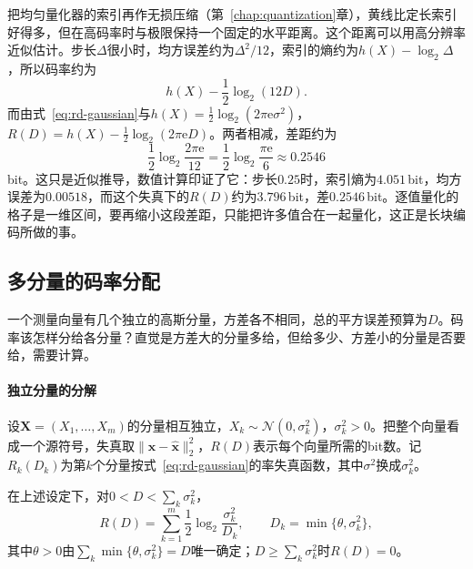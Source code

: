 把均匀量化器的索引再作无损压缩（第~\ref{chap:quantization}章），黄线比定长索引好得多，但在高码率时与极限保持一个固定的水平距离。这个距离可以用高分辨率近似估计。步长$\Delta$很小时，均方误差约为$\Delta^{2}/12$，索引的熵约为$h(X)-\log_2\Delta$，所以码率约为
\[
  h(X)-\frac12\log_2(12D).
\]
而由式~\eqref{eq:rd-gaussian}与$h(X)=\frac12\log_2(2\pi\mathrm{e}\sigma^{2})$，$R(D)=h(X)-\frac12\log_2(2\pi\mathrm{e}D)$。两者相减，差距约为
\[
  \frac12\log_2\frac{2\pi\mathrm{e}}{12}=\frac12\log_2\frac{\pi\mathrm{e}}{6}\approx0.2546
\]
bit。这只是近似推导，数值计算印证了它：步长$0.25$时，索引熵为$4.051$\,bit，均方误差为$0.00518$，而这个失真下的$R(D)$约为$3.796$\,bit，差$0.2546$\,bit。逐值量化的格子是一维区间，要再缩小这段差距，只能把许多值合在一起量化，这正是长块编码所做的事。

\subsection{多分量的码率分配}
\label{sec:rd-allocation}

一个测量向量有几个独立的高斯分量，方差各不相同，总的平方误差预算为$D$。码率该怎样分给各分量？直觉是方差大的分量多给，但给多少、方差小的分量是否要给，需要计算。

\paragraph{独立分量的分解}
设$\bm{X}=(X_1,\dots,X_m)$的分量相互独立，$X_k\sim\mathcal{N}(0,\sigma_k^{2})$，$\sigma_k^{2}>0$。把整个向量看成一个源符号，失真取$\lVert\bm{x}-\hat{\bm{x}}\rVert_2^{2}$，$R(D)$表示每个向量所需的bit数。记$R_k(D_k)$为第$k$个分量按式~\eqref{eq:rd-gaussian}的率失真函数，其中$\sigma^{2}$换成$\sigma_k^{2}$。

\begin{theorem}[反注水]
\label{thm:rd-reverse-waterfilling}
在上述设定下，对$0<D<\sum_k\sigma_k^{2}$，
\begin{equation}
  R(D)=\sum_{k=1}^{m}\frac12\log_2\frac{\sigma_k^{2}}{D_k},\qquad D_k=\min\{\theta,\sigma_k^{2}\},
  \label{eq:rd-reverse-waterfilling}
\end{equation}
其中$\theta>0$由$\sum_k\min\{\theta,\sigma_k^{2}\}=D$唯一确定；$D\geq\sum_k\sigma_k^{2}$时$R(D)=0$。
\end{theorem}

